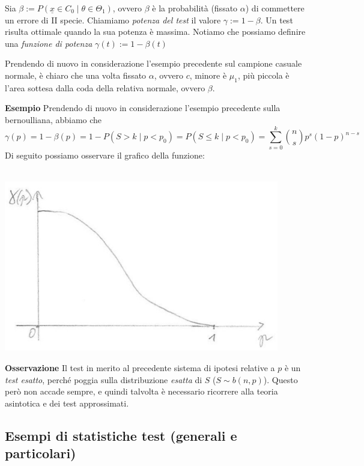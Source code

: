 \begin{definizione} Sia $\beta := P(\underline{x} \in C_0 \mid \theta \in \Theta_1)$, ovvero $\beta$ è la probabilità (fissato $\alpha$) di commettere un errore di II specie. Chiamiamo \textit{potenza del test} il valore $\gamma := 1-\beta$. Un test risulta ottimale quando la sua potenza è massima. Notiamo che possiamo definire una \textit{funzione di potenza} $\gamma(t) := 1-\beta(t)$
\end{definizione}
\begin{oss} Prendendo di nuovo in considerazione l'esempio precedente sul campione casuale normale, è chiaro che una volta fissato $\alpha$, ovvero $c$, minore è $\mu_1$, più piccola è l'area sottesa dalla coda della relativa normale, ovvero $\beta$.
\end{oss}
\noindent \textbf{Esempio} Prendendo di nuovo in considerazione l'esempio precedente sulla bernoulliana, abbiamo che 
$$\gamma(p) = 1-\beta(p) = 1- P(S > k \mid p<p_0) = P(S \leq k \mid p<p_0) = \displaystyle \sum_{s=0}^k \binom{n}{s} p^s (1-p)^{n-s}$$
Di seguito possiamo osservare il grafico della funzione:\\
\\
\begin{center}
\includegraphics [width=12cm] {immagini/grafico_3.jpg}
\end{center}
\textbf{Osservazione} Il test in merito al precedente sistema di ipotesi relative a $p$ è un \textit{test esatto}, perché poggia sulla distribuzione \textit{esatta} di $S$ ($S \sim b(n,p)$). Questo però non accade sempre, e quindi talvolta è necessario ricorrere alla teoria asintotica e dei test approssimati.\\


\subsection{Esempi di statistiche test (generali e particolari)}


